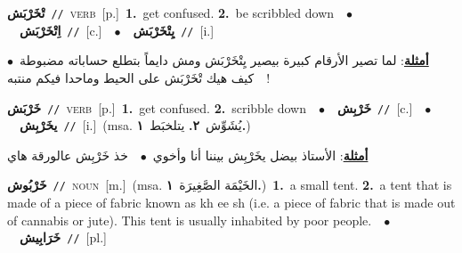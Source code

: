 \documentclass[10pt,a4paper,twoside]{article} %
\begin{document}
\begin{multicols}{2}
{\setlength\topsep{0pt}\textbf{\foreignlanguage{arabic}{تْخَرْبَش}}\ {\color{gray}\texttt{//}\color{black}}\ \textsc{verb}\ [p.]\ \textbf{1.}~get confused.  \textbf{2.}~be scribbled down\ \ $\bullet$\ \ \setlength\topsep{0pt}\textbf{\foreignlanguage{arabic}{اِتْخَرْبَش}}\ {\color{gray}\texttt{//}\color{black}}\ [c.]\ \ $\bullet$\ \ \setlength\topsep{0pt}\textbf{\foreignlanguage{arabic}{يِتْخَرْبَش}}\ {\color{gray}\texttt{//}\color{black}}\ [i.]\  \begin{flushright}\color{gray}\foreignlanguage{arabic}{\textbf{\underline{\foreignlanguage{arabic}{أمثلة}}}: لما تصير الأرقام كبيرة بيصير يِتْخَرْبَش ومش دايماً بتطلع حساباته مضبوطة\ $\bullet$\ \  كيف هيك تْخَرْبَش على الحيط وماحدا فيكم منتبه!}\end{flushright}\color{black}} \vspace{2mm}

{\setlength\topsep{0pt}\textbf{\foreignlanguage{arabic}{خَرْبَش}}\ {\color{gray}\texttt{//}\color{black}}\ \textsc{verb}\ [p.]\ \textbf{1.}~get confused.  \textbf{2.}~scribble down\ \ $\bullet$\ \ \setlength\topsep{0pt}\textbf{\foreignlanguage{arabic}{خَرْبِش}}\ {\color{gray}\texttt{//}\color{black}}\ [c.]\ \ $\bullet$\ \ \setlength\topsep{0pt}\textbf{\foreignlanguage{arabic}{يخَرْبِش}}\ {\color{gray}\texttt{//}\color{black}}\ [i.]\ \color{gray}(msa. \foreignlanguage{arabic}{يُشَوِّش}~\foreignlanguage{arabic}{\textbf{٢.}}  \foreignlanguage{arabic}{يتلخبَط}~\foreignlanguage{arabic}{\textbf{١.}})\color{black}\  \begin{flushright}\color{gray}\foreignlanguage{arabic}{\textbf{\underline{\foreignlanguage{arabic}{أمثلة}}}: الأستاذ بيضل يخَرْبِش بيننا أنا وأخوي\ $\bullet$\ \  خذ خَرْبِش عالورقة هاي}\end{flushright}\color{black}} \vspace{2mm}

{\setlength\topsep{0pt}\textbf{\foreignlanguage{arabic}{خَرْبُوش}}\ {\color{gray}\texttt{//}\color{black}}\ \textsc{noun}\ [m.]\ \color{gray}(msa. \foreignlanguage{arabic}{الخَيْمَة الصَّغِيرَة}~\foreignlanguage{arabic}{\textbf{١.}})\color{black}\ \textbf{1.}~a small tent.  \textbf{2.}~a tent that is made of a piece of fabric known as kh ee sh (i.e. a piece of fabric that is made out of cannabis or jute). This tent is usually inhabited by poor people.\ \ $\bullet$\ \ \setlength\topsep{0pt}\textbf{\foreignlanguage{arabic}{خَرَابِيش}}\ {\color{gray}\texttt{//}\color{black}}\ [pl.]\ } \vspace{2mm}


\end{multicols}
\end{document}
